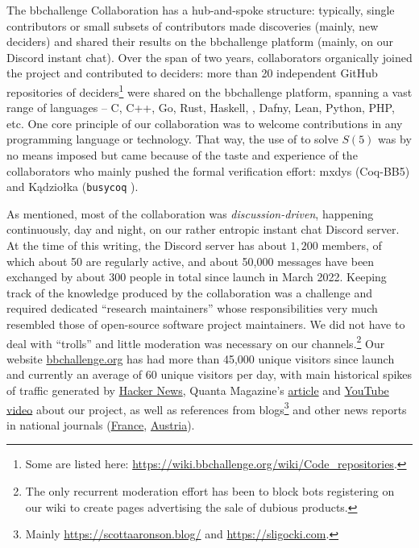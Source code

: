 \documentclass[a4paper,british]{article}
\theoremstyle{definition} %
\numberwithin{equation}{section}
\theoremstyle{definition} %
\newcommand{\CoqBB}{Coq-BB5\xspace}
\begin{document}
The bbchallenge Collaboration has a hub-and-spoke structure: typically, single contributors or small subsets of contributors made discoveries (mainly, new deciders) and shared their results on the bbchallenge platform (mainly, on our Discord instant chat). Over the span of two years, collaborators organically joined the project and contributed to deciders: more than 20 independent GitHub repositories of deciders\footnote{Some are listed here: \url{https://wiki.bbchallenge.org/wiki/Code_repositories}.} were shared on the bbchallenge platform, spanning a vast range of languages -- C, C++, Go, Rust, Haskell, \Coq, Dafny, Lean, Python, PHP, etc. One core principle of our collaboration was to welcome contributions in any programming language or technology. That way, the use of \Coq to solve $S(5)$ was by no means imposed but came because of the taste and experience of the collaborators who mainly pushed the formal verification effort: mxdys (\CoqBB) and Kądziołka (\texttt{busycoq} \cite{busycoq}).


As mentioned, most of the collaboration was \textit{discussion-driven}, happening continuously, day and night, on our rather entropic instant chat Discord server. At the time of this writing, the Discord server has about $1{,}200$ members, of which about 50 are regularly active, and about 50,000 messages have been exchanged by about 300 people in total since launch in March 2022. Keeping track of the knowledge produced by the collaboration was a challenge and required dedicated ``research maintainers'' whose responsibilities very much resembled those of open-source software project maintainers. We did not have to deal with ``trolls'' and little moderation was necessary on our channels.\footnote{The only recurrent moderation effort has been to block bots registering on our wiki to create pages advertising the sale of dubious products.} Our website \href{https://bbchallenge.or}{bbchallenge.org} has had more than 45,000 unique visitors since launch and currently an average of 60 unique visitors per day, with main historical spikes of traffic generated by \href{https://news.ycombinator.com/item?id=34689081}{Hacker News},  Quanta Magazine's \href{https://www.quantamagazine.org/amateur-mathematicians-find-fifth-busy-beaver-turing-machine-20240702/}{article} and \href{https://www.youtube.com/watch?v=rmx3FBPzDuk}{YouTube video} about our project, as well as references from blogs\footnote{Mainly \url{https://scottaaronson.blog/} and \url{https://sligocki.com}.} and other news reports in national journals (\href{https://www.lemonde.fr/sciences/article/2024/07/17/mathematiques-le-defi-du-castor-affaire-resolu_6251337_1650684.html}{France}, \href{https://www.derstandard.de/story/3000000249211/durchbruch-beim-mathematischen-problem-des-fleissigen-bibers}{Austria}).
\end{document}

